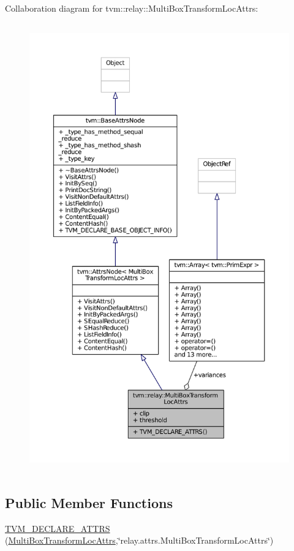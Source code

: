 Collaboration diagram for tvm\+:\+:relay\+:\+:Multi\+Box\+Transform\+Loc\+Attrs\+:
\nopagebreak
\begin{figure}[H]
\begin{center}
\leavevmode
\includegraphics[height=550pt]{structtvm_1_1relay_1_1MultiBoxTransformLocAttrs__coll__graph}
\end{center}
\end{figure}
\subsection*{Public Member Functions}
\begin{DoxyCompactItemize}
\item 
\hyperlink{structtvm_1_1relay_1_1MultiBoxTransformLocAttrs_a8d1c516ef27fd8c31a0b4e3876434ab3}{T\+V\+M\+\_\+\+D\+E\+C\+L\+A\+R\+E\+\_\+\+A\+T\+T\+RS} (\hyperlink{structtvm_1_1relay_1_1MultiBoxTransformLocAttrs}{Multi\+Box\+Transform\+Loc\+Attrs},\char`\"{}relay.\+attrs.\+Multi\+Box\+Transform\+Loc\+Attrs\char`\"{})
\end{DoxyCompactItemize}
